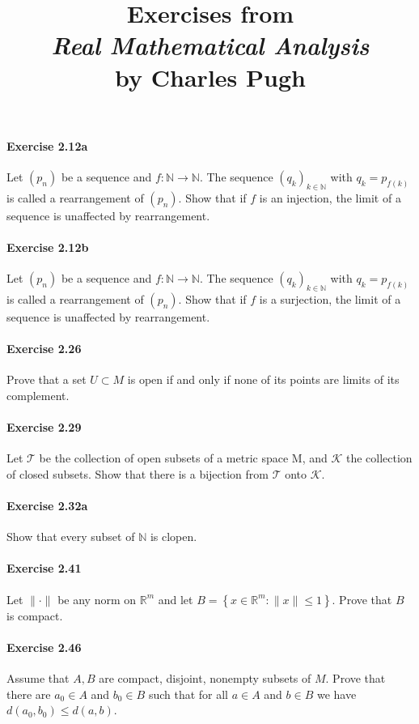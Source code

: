 \documentclass{article}
\title{\textbf{
Exercises from \\
\textit{Real Mathematical Analysis} \\
by Charles Pugh
}}
\date{}
\begin{document}
\maketitle


\paragraph{Exercise 2.12a} Let $(p_n)$ be a sequence and $f:\mathbb{N}\to\mathbb{N}$. The sequence $(q_k)_{k\in\mathbb{N}}$ with $q_k=p_{f(k)}$ is called a rearrangement of $(p_n)$. Show that if $f$ is an injection, the limit of a sequence is unaffected by rearrangement.

\paragraph{Exercise 2.12b} Let $(p_n)$ be a sequence and $f:\mathbb{N}\to\mathbb{N}$. The sequence $(q_k)_{k\in\mathbb{N}}$ with $q_k=p_{f(k)}$ is called a rearrangement of $(p_n)$. Show that if $f$ is a surjection, the limit of a sequence is unaffected by rearrangement.

\paragraph{Exercise 2.26} Prove that a set $U \subset M$ is open if and only if none of its points are limits of its complement.

\paragraph{Exercise 2.29} Let $\mathcal{T}$ be the collection of open subsets of a metric space $\mathrm{M}$, and $\mathcal{K}$ the collection of closed subsets. Show that there is a bijection from $\mathcal{T}$ onto $\mathcal{K}$.

\paragraph{Exercise 2.32a} Show that every subset of $\mathbb{N}$ is clopen.

\paragraph{Exercise 2.41} Let $\|\cdot\|$ be any norm on $\mathbb{R}^{m}$ and let $B=\left\{x \in \mathbb{R}^{m}:\|x\| \leq 1\right\}$. Prove that $B$ is compact.

\paragraph{Exercise 2.46} Assume that $A, B$ are compact, disjoint, nonempty subsets of $M$. Prove that there are $a_0 \in A$ and $b_0 \in B$ such that for all $a \in A$ and $b \in B$ we have $d(a_0, b_0) \leq d(a, b)$.
\end{document}
